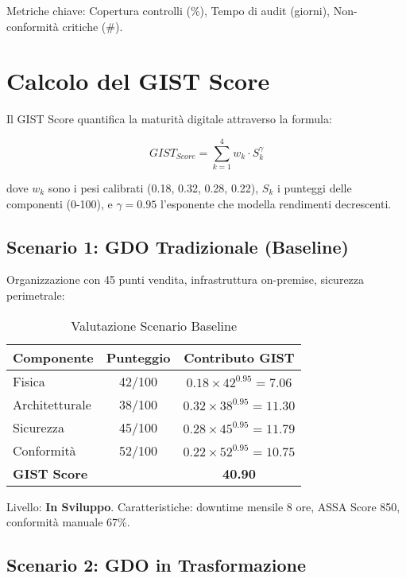 Metriche chiave: Copertura controlli (\%), Tempo di audit (giorni), Non-conformità critiche (\#).

\section{Calcolo del GIST Score}
\label{sec:calcolo_gist}

Il GIST Score quantifica la maturità digitale attraverso la formula:

$$GIST_{Score} = \sum_{k=1}^{4} w_k \cdot S_k^{\gamma}$$

dove $w_k$ sono i pesi calibrati (0.18, 0.32, 0.28, 0.22), $S_k$ i punteggi delle componenti (0-100), e $\gamma = 0.95$ l'esponente che modella rendimenti decrescenti.

\subsection{Scenario 1: GDO Tradizionale (Baseline)}
\label{subsec:scenario1}

Organizzazione con 45 punti vendita, infrastruttura on-premise, sicurezza perimetrale:

\begin{table}[htbp]
\centering
\caption{Valutazione Scenario Baseline}
\label{tab:scenario1}
\begin{tabular}{lcc}
\toprule
\textbf{Componente} & \textbf{Punteggio} & \textbf{Contributo GIST} \\
\midrule
Fisica & 42/100 & $0.18 \times 42^{0.95} = 7.06$ \\
Architetturale & 38/100 & $0.32 \times 38^{0.95} = 11.30$ \\
Sicurezza & 45/100 & $0.28 \times 45^{0.95} = 11.79$ \\
Conformità & 52/100 & $0.22 \times 52^{0.95} = 10.75$ \\
\midrule
\textbf{GIST Score} & & \textbf{40.90} \\
\bottomrule
\end{tabular}
\end{table}

Livello: \textbf{In Sviluppo}. Caratteristiche: downtime mensile 8 ore, ASSA Score 850, conformità manuale 67\%.

\subsection{Scenario 2: GDO in Trasformazione}
\label{subsec:scenario2}

